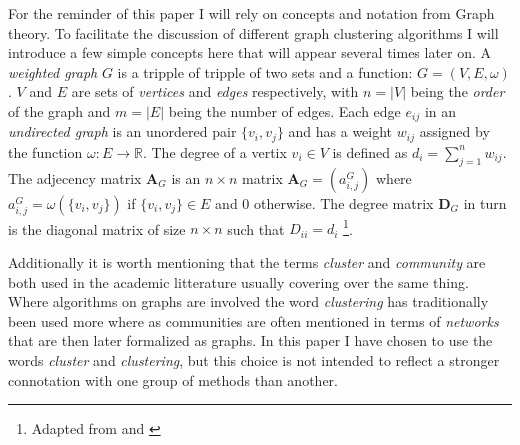For the reminder of this paper I will rely on concepts and notation from 
Graph theory. To facilitate the discussion of different graph clustering 
algorithms I will introduce a few simple concepts here that will appear 
several times later on. A \emph{weighted graph} $G$ is a tripple of 
tripple of two sets and a function: $G = (V, E, \omega)$. $V$ and $E$ 
are sets of \emph{vertices} and \emph{edges} respectively, with $n = 
|V|$ being the \emph{order} of the graph and $m = |E|$ being the number 
of edges. Each edge $e_{ij}$ in an \emph{undirected graph} is an 
unordered pair $\{v_i, v_j\}$ and has a weight $w_{ij}$ assigned by the 
function $\omega : E \rightarrow \mathbb{R}$. The degree of a vertix 
$v_i \in V$ is defined as $d_i = \sum_{j = 1}^n w_{ij}$. The adjecency 
matrix $\textbf{A}_G$ is an $n \times n$ matrix $\textbf{A}_G = 
(a_{i,j}^G)$ where $a_{i,j}^G = \omega(\{v_i,v_j\})$ if $\{v_i,v_j\} \in 
E$ and $0$ otherwise.  The degree matrix $\textbf{D}_G$ in turn is the 
diagonal matrix of size $n \times n$ such that $D_{ii} = d_i$
\footnote{Adapted from \cite{schaeffer2007} and \cite{von2007}}.

Additionally it is worth mentioning that the terms \emph{cluster} and 
\emph{community} are both used in the academic litterature usually 
covering over the same thing. Where algorithms on graphs are involved 
the word \emph{clustering} has traditionally been used more where as 
communities are often mentioned in terms of \emph{networks} that are 
then later formalized as graphs. In this paper I have chosen to use the 
words \emph{cluster} and \emph{clustering}, but this choice is not 
intended to reflect a stronger connotation with one group of methods 
than another.
